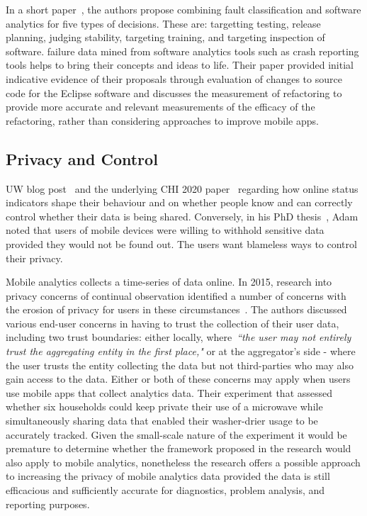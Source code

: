 
In a short paper~\citep{kidwell2015_toward_fault_taxonomy_application_of_software_analytics}, the authors propose combining fault classification and software analytics for five types of decisions. These are: targetting testing, release planning, judging stability, targeting training, and targeting inspection of software. failure data mined from software analytics tools such as crash reporting tools helps to bring their concepts and ideas to life. Their paper provided initial indicative evidence of their proposals through evaluation of changes to source code for the Eclipse software and discusses the measurement of refactoring to provide more accurate and relevant measurements of the efficacy of the refactoring, rather than considering approaches to improve mobile apps.

\subsection{Privacy and Control}

UW blog post~\cite{mcquate_I_saw_you_were_online} and the underlying CHI 2020 paper~\cite{cobb2020_ux_s_with_online_status_indicators} regarding how online status indicators shape their behaviour and on whether people know and can correctly control whether their data is being shared. Conversely, in his PhD thesis~\citep{adam2009balancing}, Adam noted that users of mobile devices were willing to withhold sensitive data provided they would not be found out. The users want blameless ways to control their privacy.

Mobile analytics collects a time-series of data online. In 2015, research into privacy concerns of continual observation identified a number of concerns with the erosion of privacy for users in these circumstances~\citep{erdogdu2015_privacy_utility_tradeoff_under_continual_observation}. The authors discussed various end-user concerns in having to trust the collection of their user data, including two trust boundaries: either locally, where~\emph{``the user may not entirely trust the aggregating entity in the first place,"} or at the aggregator's side - where the user trusts the entity collecting the data but not third-parties who may also gain access to the data. Either or both of these concerns may apply when users use mobile apps that collect analytics data. Their experiment that assessed whether six households could keep private their use of a microwave while simultaneously sharing data that enabled their washer-drier usage to be accurately tracked. Given the small-scale nature of the experiment it would be premature to determine whether the framework proposed in the research would also apply to mobile analytics, nonetheless the research offers a possible approach to increasing the privacy of mobile analytics data provided the data is still efficacious and sufficiently accurate for diagnostics, problem analysis, and reporting purposes.  

